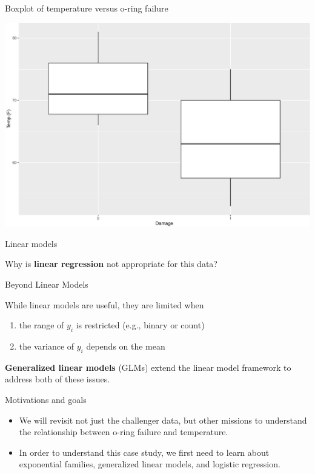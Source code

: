 \documentclass[
  ignorenonframetext,
]{beamer}
\providecommand{\tightlist}{%
  \setlength{\itemsep}{0pt}\setlength{\parskip}{0pt}}
\begin{document}
\begin{frame}{Boxplot of temperature versus o-ring failure}
\protect\hypertarget{boxplot-of-temperature-versus-o-ring-failure}{}

\includegraphics{9-logistic-regression_files/figure-beamer/unnamed-chunk-3-1.pdf}

\end{frame}

\begin{frame}{Linear models}
\protect\hypertarget{linear-models}{}

Why is \textbf{linear regression} not appropriate for this data?

\end{frame}

\begin{frame}{Beyond Linear Models}
\protect\hypertarget{beyond-linear-models}{}

While linear models are useful, they are limited when

\begin{enumerate}
\tightlist
\item
  the range of \(y_i\) is restricted (e.g., binary or count)
\item
  the variance of \(y_i\) depends on the mean
\end{enumerate}

\textbf{Generalized linear models} (GLMs) extend the linear model
framework to address both of these issues.

\end{frame}

\begin{frame}{Motivations and goals}
\protect\hypertarget{motivations-and-goals}{}

\begin{itemize}
\tightlist
\item
  We will revisit not just the challenger data, but other missions to
  understand the relationship between o-ring failure and temperature.
\item
  In order to understand this case study, we first need to learn about
  exponential families, generalized linear models, and logistic
  regression.
\end{itemize}

\end{frame}
\end{document}
